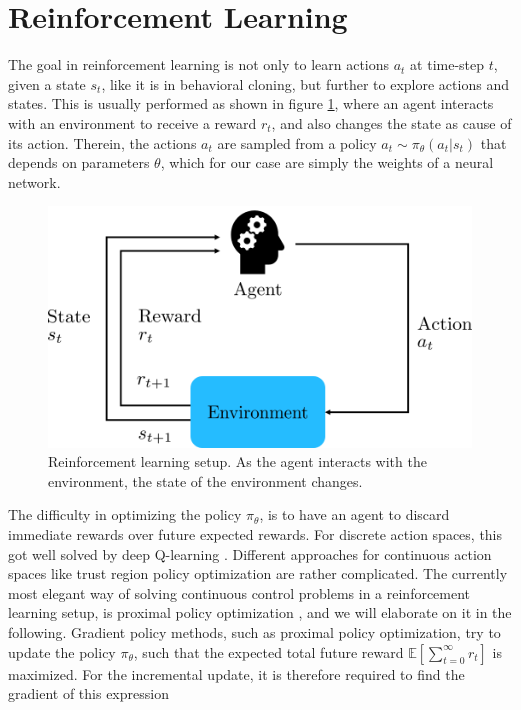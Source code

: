 \FloatBarrier
\section{Reinforcement Learning}
\label{sec::223_rl}
The goal in reinforcement learning is not only to learn actions $a_t$ at time-step $t$, given a state $s_t$, like it is in behavioral cloning, but further to explore actions and states. This is usually performed as shown in figure \ref{fig::223_rl}, where an agent interacts with an environment to receive a reward $r_t$, and also changes the state as cause of its action. Therein, the actions $a_t$ are sampled from a policy $a_t\sim\pi_\theta(a_t|s_t)$ that depends on parameters $\theta$, which for our case are simply the weights of a neural network. 
\begin{figure}[h!]
	\centering
	\includegraphics[scale=.5]{chapters/04_principles_of_machine_learning/img/reinforcement_learning.png}
	\caption{Reinforcement learning setup. As the agent interacts with the environment, the state of the environment changes.}
	\label{fig::223_rl}
\end{figure}
The difficulty in optimizing the policy $\pi_\theta$, is to have an agent to discard immediate rewards over future expected rewards. For discrete action spaces, this got well solved by deep Q-learning \cite{mnih2015human}. Different approaches for continuous action spaces like trust region policy optimization \cite{schulman2015trust} are rather complicated. The currently most elegant way of solving continuous control problems in a reinforcement learning setup, is proximal policy optimization \cite{schulman2017proximal}, and we will elaborate on it in the following. Gradient policy methods, such as proximal policy optimization, try to update the policy $\pi_\theta$, such that the expected total future reward $\mathbb{E}\left[\sum_{t=0}^\infty r_t\right]$ is maximized. For the incremental update, it is therefore required to find the gradient of this expression

